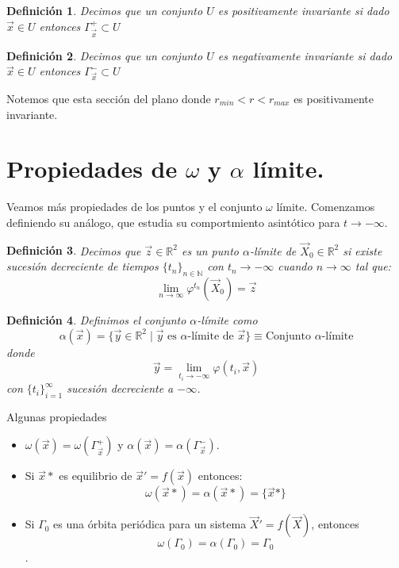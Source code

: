 \documentclass[12pt, a4paper]{report}
\newtheorem{definition}{Definición}
\begin{document}
\begin{definition}
	Decimos que un conjunto $U$ es positivamente invariante si dado $\vec{x}\in U$ entonces  $\varGamma_{\vec{x}}^{+}\subset U$
\end{definition}

\begin{definition}
	Decimos que un conjunto $U$ es negativamente invariante si dado $\vec{x}\in U$ entonces  $\varGamma_{\vec{x}}^{-}\subset U$
\end{definition}

Notemos que esta sección del plano donde $r_{min}<r<r_{max}$ es positivamente invariante.
\newpage

\section{Propiedades de $\omega$ y $\alpha$ límite.}

Veamos más propiedades de los puntos y el conjunto $\omega$ límite. Comenzamos definiendo su análogo,
que estudia su comportmiento asintótico para $t\to-\infty$.\\

\begin{definition}
	Decimos que $\vec{z}\in\mathbb{R}^2$ es un punto $\alpha$-límite
	de $\vec{X}_0\in\mathbb{R}^2$ si existe sucesión decreciente de
	tiempos $\{t_n\}_{n\in\mathbb{N}}$
	con $t_n \to-\infty$ cuando $n\to \infty$ tal que:
	$$\lim_{n\to\infty}\varphi^{t_n}(\vec{X}_0)=\vec{z}$$
\end{definition}


\begin{definition}
	Definimos el conjunto $\alpha$-límite como $$\alpha(\vec{x})=\{\vec{y}\in\mathbb{R}^2\mid\vec{y}
		\text{ es } \alpha\text{-límite de }\vec{x}\}\equiv\text{Conjunto }\alpha\text{-límite}$$
	donde
	$$\vec{y}=\lim_{t_i\to-\infty}\varphi(t_i,\vec{x})$$
	con $\{t_i\}_{i=1}^{\infty}$ sucesión decreciente a $-\infty$.
\end{definition}

Algunas propiedades
\begin{itemize}
	\item $\omega(\vec{x})=\omega(\varGamma_{\vec{x}}^{+})$
	      y $\alpha(\vec{x})=\alpha(\varGamma_{\vec{x}}^{-})$.\\
	\item Si $\vec{x}*$ es equilibrio de $\vec{x}'=f(\vec{x})$ entonces:
	      $$\omega(\vec{x}*)=\alpha(\vec{x}*)=\{\vec{x}*\}$$
	\item Si $\varGamma_0$ es una órbita periódica para un sistema $\vec{X}'=f(\vec{X})$, entonces
	      $$\omega(\varGamma_0)=\alpha(\varGamma_0)=\varGamma_0$$.
\end{itemize}
\end{document}
